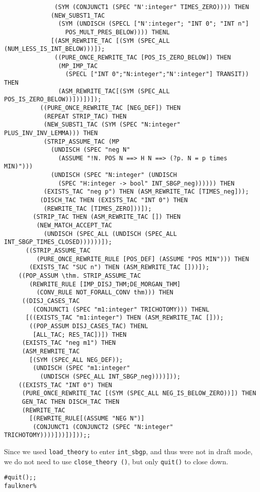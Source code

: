 \begin{verbatim}
              (SYM (CONJUNCT1 (SPEC "N':integer" TIMES_ZERO)))) THEN
             (NEW_SUBST1_TAC
               (SYM (UNDISCH (SPECL ["N':integer"; "INT 0"; "INT n"]
                 POS_MULT_PRES_BELOW)))) THENL
             [(ASM_REWRITE_TAC [(SYM (SPEC_ALL (NUM_LESS_IS_INT_BELOW)))]);
              ((PURE_ONCE_REWRITE_TAC [POS_IS_ZERO_BELOW]) THEN
               (MP_IMP_TAC
                 (SPECL ["INT 0";"N:integer";"N':integer"] TRANSIT)) THEN
               (ASM_REWRITE_TAC[(SYM (SPEC_ALL POS_IS_ZERO_BELOW))]))])]);
          ((PURE_ONCE_REWRITE_TAC [NEG_DEF]) THEN
           (REPEAT STRIP_TAC) THEN
           (NEW_SUBST1_TAC (SYM (SPEC "N:integer" PLUS_INV_INV_LEMMA))) THEN
           (STRIP_ASSUME_TAC (MP
             (UNDISCH (SPEC "neg N"
               (ASSUME "!N. POS N ==> H N ==> (?p. N = p times MIN)")))
             (UNDISCH (SPEC "N:integer" (UNDISCH
               (SPEC "H:integer -> bool" INT_SBGP_neg)))))) THEN
           (EXISTS_TAC "neg p") THEN (ASM_REWRITE_TAC [TIMES_neg]));
          (DISCH_TAC THEN (EXISTS_TAC "INT 0") THEN
           (REWRITE_TAC [TIMES_ZERO]))]);
        (STRIP_TAC THEN (ASM_REWRITE_TAC []) THEN
         (NEW_MATCH_ACCEPT_TAC
           (UNDISCH (SPEC_ALL (UNDISCH (SPEC_ALL INT_SBGP_TIMES_CLOSED))))))]);
      ((STRIP_ASSUME_TAC
         (PURE_ONCE_REWRITE_RULE [POS_DEF] (ASSUME "POS MIN"))) THEN
       (EXISTS_TAC "SUC n") THEN (ASM_REWRITE_TAC []))]);
    ((POP_ASSUM \thm. STRIP_ASSUME_TAC 
       (REWRITE_RULE [IMP_DISJ_THM;DE_MORGAN_THM]
         (CONV_RULE NOT_FORALL_CONV thm))) THEN
     ((DISJ_CASES_TAC
        (CONJUNCT1 (SPEC "m1:integer" TRICHOTOMY))) THENL
      [((EXISTS_TAC "m1:integer") THEN (ASM_REWRITE_TAC []));
       ((POP_ASSUM DISJ_CASES_TAC) THENL
        [ALL_TAC; RES_TAC])]) THEN
     (EXISTS_TAC "neg m1") THEN
     (ASM_REWRITE_TAC
       [(SYM (SPEC_ALL NEG_DEF));
        (UNDISCH (SPEC "m1:integer"
          (UNDISCH (SPEC_ALL INT_SBGP_neg))))]));
    ((EXISTS_TAC "INT 0") THEN
     (PURE_ONCE_REWRITE_TAC [(SYM (SPEC_ALL NEG_IS_BELOW_ZERO))]) THEN
     GEN_TAC THEN DISCH_TAC THEN
     (REWRITE_TAC
       [(REWRITE_RULE[(ASSUME "NEG N")]
        (CONJUNCT1 (CONJUNCT2 (SPEC "N:integer" TRICHOTOMY))))]))])]));;
\end{verbatim}

Since we used {\small\verb+load_theory+} to enter
{\small\verb+int_sbgp+}, and thus were not in draft mode, we do not
need to use {\small\verb+close_theory ()+}, but only
{\small\verb+quit()+} to close down. 
\begin{session}
\begin{verbatim}
#quit();;
faulkner%
\end{verbatim}
\end{session}

